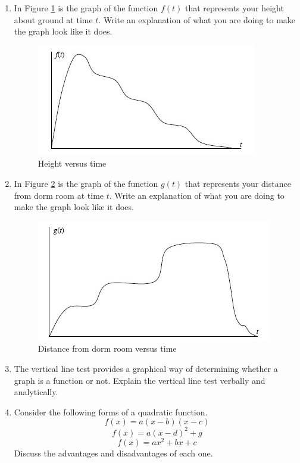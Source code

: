 \begin{enumerate}

\item In Figure \ref{Chapter1Figureb}  is the graph of the function $f(t)$ that represents your height about ground at time $t$.  Write an explanation of what you are doing to make the graph look like it does.  \cite{MR}   %

\begin{figure}[ht]
	\centering
		\includegraphics{TeXGraphics/Chapter1b.jpg}
	\caption{Height versus time}
	\label{Chapter1Figureb}
\end{figure}

\item In Figure \ref{Chapter1Figurec} is the graph of the function $g(t)$ that represents your distance from dorm room at time $t$.  Write an explanation of what you are doing to make the graph look like it does.%

\begin{figure}[ht]
	\centering
		\includegraphics{TeXGraphics/Chapter1c.jpg}
	\caption{Distance from dorm room versus time}
	\label{Chapter1Figurec}
\end{figure}

\item The vertical line test provides a graphical way of determining whether a graph is a function or not.  Explain the vertical line test verbally and analytically. 

\item Consider the following forms of a quadratic function.    $$f(x) = a(x - b)(x - c)$$  $$f(x) = a(x - d)^2 + g$$  $$f(x) = ax^2 + bx + c$$    Discuss the advantages and disadvantages of each one. 


\end{enumerate}
